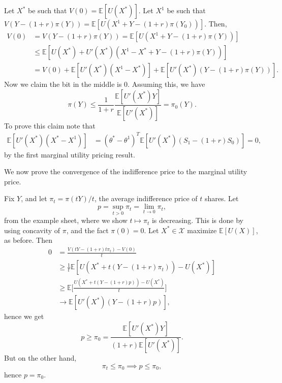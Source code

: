 \documentclass[12pt]{article}
\begin{document}
\begin{proofbox}
	Let $X^{\ast}$ be such that $V(0) = \mathbb{E}[U(X^{\ast})]$. Let $X^1$ be such that $V(Y - (1+r)\pi(Y)) = \mathbb{E}[U(X^1 + Y - (1+r)\pi(Y_0))]$. Then,
	\begin{align*}
		V(0) &= V(Y - (1+r)\pi(Y)) = \mathbb{E}[U(X^1 + Y - (1+r)\pi(Y))] \\
		     &\leq \mathbb{E}[U(X^{\ast}) + U'(X^{\ast})(X^1 - X^{\ast} + Y - (1+r)\pi(Y))] \\
		     &= V(0) + \mathbb{E}[U'(X^{\ast})(X^1 - X^{\ast})] + \mathbb{E}[U'(X^{\ast})(Y - (1+r)\pi(Y))].
	\end{align*}
	Now we claim the bit in the middle is 0. Assuming this, we have
	\[
	\pi(Y) \leq \frac{1}{1 + r} \frac{\mathbb{E}[U'(X^{\ast})Y]}{\mathbb{E}[U'(X^{\ast})]} = \pi_0(Y).
	\]
	To prove this claim note that
	\begin{align*}
		\mathbb{E}[U'(X^{\ast})(X^{\ast} - X^1)] &= (\theta^{\ast} - \theta^1)^{T} \mathbb{E}[U'(X^{\ast}) (S_1 - (1+r)S_0)] = 0,
	\end{align*}
	by the first marginal utility pricing result.
\end{proofbox}


We now prove the convergence of the indifference price to the marginal utility price.

\begin{proofbox}
	Fix $Y$, and let $\pi_t = \pi(tY)/t$, the average indifference price of $t$ shares. Let
	\[
	p= \sup_{t > 0} \pi_t = \lim_{t \to 0} \pi_t,
	\]
	from the example sheet, where we show $t \mapsto \pi_t$ is decreasing. This is done by using concavity of $\pi$, and the fact $\pi(0) = 0$. Let $X^{\ast} \in \mathcal{X}$ maximize $\mathbb{E}[U(X)]$, as before. Then
	\begin{align*}
		0 &= \frac{V(tY - (1+r)t\pi_t) - V(0)}{t} \\
		  &\geq \frac{1}{t} \mathbb{E}[U(X^{\ast} + t(Y - (1+r)\pi_t)) - U(X^{\ast})] \\
		  &\geq \mathbb{E}\biggl[ \frac{U(X^{\ast} + t(Y - (1+r)p)) - U(X^{\ast})}{t} \biggr] \\
		  &\to \mathbb{E}[U'(X^{\ast})(Y - (1+r)p)],
	\end{align*}
	hence we get
	\[
	p \geq \pi_0 = \frac{\mathbb{E}[U'(X^{\ast})Y]}{(1+r)\mathbb{E}[U'(X^{\ast})]}.
	\]
	But on the other hand,
	\[
	\pi_t \leq \pi_0 \implies p \leq \pi_0,
	\]
	hence $p = \pi_0$.
\end{proofbox}
\end{document}

